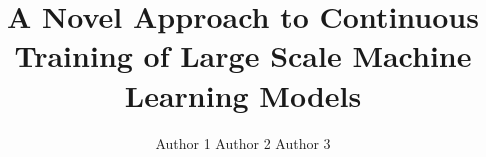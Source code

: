 \documentclass{sig-alternate-05-2015}
\begin{document}








%

\title{A Novel Approach to Continuous Training of Large Scale Machine Learning Models}

%
%
%
%
%

%
\author{
%
%
\alignauthor
Author 1
\alignauthor
Author 2
\alignauthor Author 3
}
\end{document}
